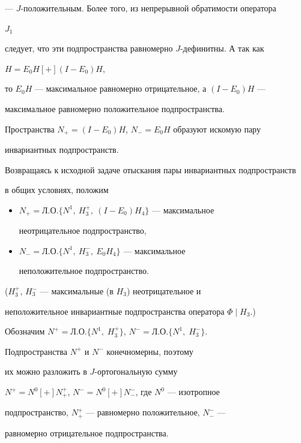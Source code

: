 --- $J$-положительным. Более того, из непрерывной обратимости оператора


$J_1$


следует, что эти подпространства равномерно $J$-дефинитны. А так как


$H=E_0H[+](I-E_0)H$,


то $E_0H$ --- максимальное равномерно отрицательное, а $(I-E_0)H$ ---


максимальное равномерно положительное подпространства.





Пространства $N_+=(I-E_0)H$, $N_-=E_0H$ образуют искомую пару


инвариантных подпространств.





Возвращаясь к исходной задаче отыскания пары инвариантных подпространств


в общих условиях, положим


\begin{itemize}


\item[\ ] $N_+=Л.О.\{N^1,\:H^+_3,\:(I-E_0)H_4\}$ --- максимальное


неотрицательное подпространство,


\item[\ ] $N_-=Л.О.\{N^1,\:H^-_3,\:E_0H_4\}$ --- максимальное


неположительное подпространство.


\end{itemize}


($H^+_3$, $H^-_3$ --- максимальные (в $H_3$) неотрицательное и


неположительное инвариантные подпространства оператора $\Phi\mid H_3$.)





Обозначим $N^+=Л.О.\{N^1,\;H^+_3\}$, $N^-=Л.О.\{N^1,\;H^-_3\}$.


Подпространства $N^+$ и $N^-$ конечномерны, поэтому


их можно разложить в $J$-ортогональную сумму


$N^+=N^0[+]N^+_+$, $N^-=N^0[+]N^-_-$, где $N^0$ --- изотропное


подпространство, $N^+_+$ --- равномерно положительное, $N^-_-$ ---


равномерно отрицательное подпространства.





